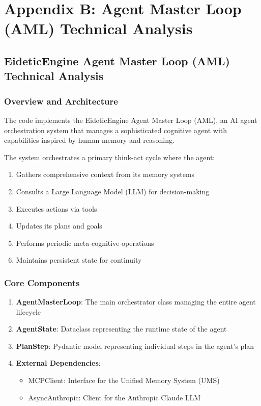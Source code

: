 \documentclass[12pt,a4paper]{article}
\begin{document}


\section{Appendix B: Agent Master Loop (AML) Technical Analysis}


\subsection*{EideticEngine Agent Master Loop (AML) Technical Analysis}

\subsubsection*{Overview and Architecture}

The code implements the EideticEngine Agent Master Loop (AML), an AI agent orchestration system that manages a sophisticated cognitive agent with capabilities inspired by human memory and reasoning.

The system orchestrates a primary think-act cycle where the agent:
\begin{enumerate}[label=\arabic*.]
    \item Gathers comprehensive context from its memory systems
    \item Consults a Large Language Model (LLM) for decision-making
    \item Executes actions via tools
    \item Updates its plans and goals
    \item Performs periodic meta-cognitive operations
    \item Maintains persistent state for continuity
\end{enumerate}

\subsubsection*{Core Components}

\begin{enumerate}[label=\arabic*.]
    \item \textbf{AgentMasterLoop}: The main orchestrator class managing the entire agent lifecycle
    \item \textbf{AgentState}: Dataclass representing the runtime state of the agent
    \item \textbf{PlanStep}: Pydantic model representing individual steps in the agent's plan
    \item \textbf{External Dependencies}:
    \begin{itemize}
        \item MCPClient: Interface for the Unified Memory System (UMS)
        \item AsyncAnthropic: Client for the Anthropic Claude LLM
    \end{itemize}
\end{enumerate}
\end{document}
